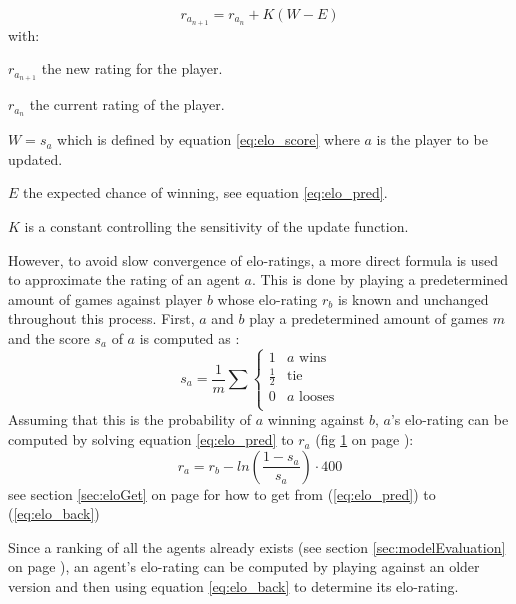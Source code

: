 \documentclass[12pt]{article}
\newcommand{\imgRef}[1]{(fig \ref{#1} on page \pageref{#1})}
\newcommand{\sectionref}[1]{section \ref{#1} on page \pageref{#1}}
\newcommand{\quckeq}[1]{(\ref{#1})}
\newcommand{\quickeq}[1]{\quckeq{#1}}
\begin{document}
\begin{equation} \label{eq:elo_update}
r_{a_{n+1}} = r_{a_n} + K(W - E)
\end{equation}
with:
\begin{description}
\item \(r_{a_{n+1}}\) the new rating for the player.
\item \(r_{a_n}\) the current rating of the player.
\item \(W = s_a\) which is defined by equation \ref{eq:elo_score} where \(a\) is the player to be updated.
\item \(E\) the expected chance of winning, see equation \ref{eq:elo_pred}.
\item \(K\) is a constant controlling the sensitivity of the update function.
\end{description}
However, to avoid slow convergence of elo-ratings, a more direct formula is used to approximate the rating of an agent \(a\). This is done by playing a predetermined amount of games against player \(b\) whose elo-rating \(r_b\) is known and unchanged throughout this process. First, \(a\) and \(b\) play a predetermined amount of games \(m\) and the score \(s_a\) of \(a\) is computed as \cite{elo1978rating}:
\begin{equation} \label{eq:elo_score}
s_a = \frac{1}{m}\sum\left\{
\begin{array}{ll}
1 &              a\textrm{ wins} \\
\frac{1}{2} & \textrm{tie}\\
0 &              a\textrm{ looses}\\
\end{array}
\right.
\end{equation}
Assuming that this is the probability of \(a\) winning against \(b\), \(a\)'s elo-rating can be computed by solving equation \ref{eq:elo_pred} to \(r_a\) \imgRef{fig:eloInv}:
\begin{equation} \label{eq:elo_back}
r_a = r_b - ln\left(\frac{1-s_a}{s_a}\right) \cdot 400
\end{equation}
see \sectionref{sec:eloGet} for how to get from \quickeq{eq:elo_pred} to \quickeq{eq:elo_back}
\begin{figure}
\center

\label{fig:eloInv}
\end{figure}
Since a ranking of all the agents already exists (see \sectionref{sec:modelEvaluation}), an agent's elo-rating can be computed by playing against an older version and then using equation \ref{eq:elo_back} to determine its elo-rating. 
\end{document}
